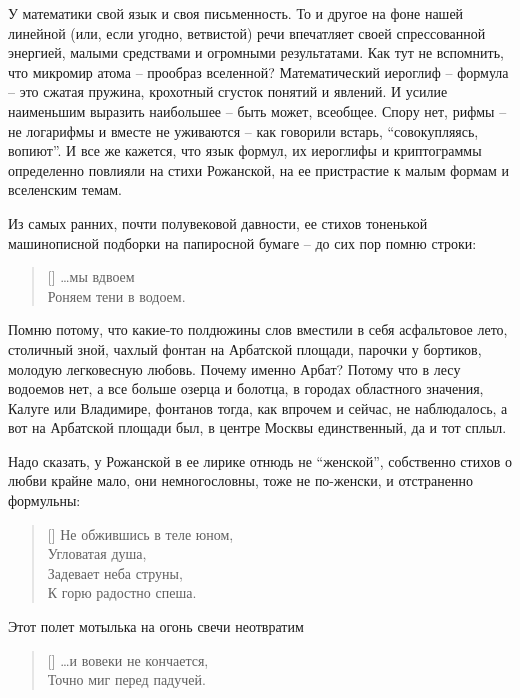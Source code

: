 \documentclass[12pt,a5paper,twoside]{article}
\begin{document}
У математики свой язык и своя письменность. То и другое на фоне нашей линейной (или, 
если угодно, ветвистой) речи впечатляет своей спрессованной энергией, малыми средствами и огромными 
результатами. Как тут не вспомнить, что микромир атома -- прообраз вселенной? Математический 
иероглиф -- формула -- это сжатая пружина, крохотный сгусток понятий и явлений. И усилие наименьшим 
выразить наибольшее -- быть может, всеобщее. Спору нет, рифмы -- не логарифмы и вместе не уживаются -- 
как говорили встарь, ``совокупляясь, вопиют''. И все же кажется, что язык формул, их иероглифы и 
криптограммы определенно повлияли на стихи Рожанской, на ее пристрастие к малым формам и вселенским темам.

Из самых ранних, почти полувековой давности, ее стихов тоненькой машинописной подборки на 
папиросной бумаге -- до сих пор помню строки:

\settowidth{\versewidth}{…мы вдвоем}
\begin{verse}[\versewidth]
…мы вдвоем\\
Роняем тени в водоем.
\end{verse}

Помню потому, что какие-то полдюжины слов вместили в себя 
асфальтовое лето, столичный зной, чахлый фонтан на Арбатской площади, 
парочки у бортиков, молодую легковесную любовь. Почему именно Арбат? 
Потому что в лесу водоемов нет, а все больше озерца и болотца, в городах 
областного значения, Калуге или Владимире, фонтанов тогда, как впрочем и сейчас, 
не наблюдалось, а вот на Арбатской площади был, в центре Москвы единственный, да и тот сплыл.
 
Надо сказать, у Рожанской в ее лирике отнюдь не ``женской'', собственно стихов о любви 
крайне мало, они немногословны, тоже не по-женски, и отстраненно формульны: 

\settowidth{\versewidth}{Не обжившись в теле юном,}
\begin{verse}[\versewidth]
Не обжившись в теле юном,\\
Угловатая душа,\\
Задевает неба струны,\\
К горю радостно спеша.
\end{verse}

Этот полет мотылька на огонь свечи неотвратим

\settowidth{\versewidth}{…и вовеки не кончается,}
\begin{verse}[\versewidth]
…и вовеки не кончается,\\
Точно миг перед падучей.
\end{verse}
\end{document}
